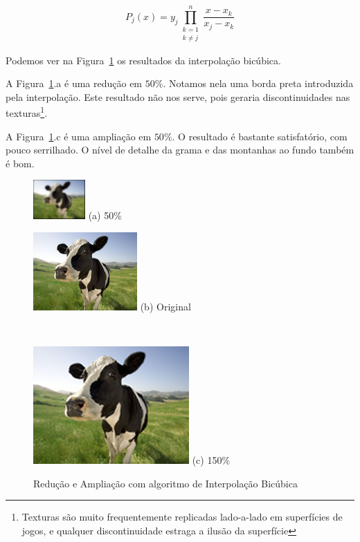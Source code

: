 \documentclass[12pt]{article}
\begin{document}
\[
  P_j(x) = y_j\prod^{n}_{\substack{k=1\\k\neq j}}\frac{x-x_k}{x_j-x_k}
\]

Podemos ver na Figura~\ref{fig:vaca:bicubic} os resultados da interpolação bicúbica.

A Figura~\ref{fig:vaca:bicubic}.a é uma redução em $50\%$. Notamos nela uma borda preta introduzida pela interpolação. Este resultado não nos serve, pois geraria discontinuidades nas texturas\footnote{Texturas são muito frequentemente replicadas lado-a-lado em superfícies de jogos, e qualquer discontinuidade estraga a ilusão da superfície}.

A Figura~\ref{fig:vaca:bicubic}.c é uma ampliação em $50\%$. O resultado é bastante satisfatório, com pouco serrilhado. O nível de detalhe da grama e das montanhas ao fundo também é bom.

\begin{figure}[H]
    \begin{minipage}{.2\textwidth}
        \centering
        \includegraphics{cow_cubic_smallest}
        (a) 50\%
    \end{minipage}%
    \begin{minipage}{0.35\textwidth}
        \centering
        \includegraphics{cow_very_small}
        (b) Original
    \end{minipage}~
    \begin{minipage}{0.35\textwidth}
        \centering
        \includegraphics{cow_cubic}
        (c) 150\%
    \end{minipage}
    \caption{Redução e Ampliação com algoritmo de Interpolação Bicúbica}
    \label{fig:vaca:bicubic}
\end{figure}
\end{document}
